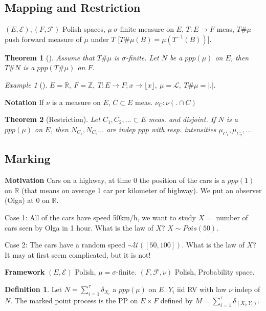\documentclass[12pt]{book}
\newtheorem{theorem}{Theorem}[section]
\theoremstyle{definition}
\newtheorem{defn}{Definition}[section]
\theoremstyle{remark}
\newtheorem{ex}{Example}[section]
\begin{document}
\subsection{Mapping and Restriction}
$(E, \mathcal{E}), (F, \mathcal{F})$ Polish spaces, $\mu\ \sigma$-finite measure on $E$,  $T:E \to F$ meas, $T\#\mu $ push forward measure of $\mu $ under $T$ [$T\#\mu(B)=\mu(T^{-1}(B))$].

\begin{theorem}[]
	Assume that $T\#\mu$ is $\sigma$-finite. Let $N$ be a $ppp(\mu)$ on $E$, then $T\#N$ is a $ppp(T\#\mu)$ on $F$.
\end{theorem}

\begin{ex}[]
	$E=\mathbb{R},\ F=\mathbb{Z},\ T:E \to F; x \to \lfloor x \rfloor,\ \mu= \mathcal{L},\ T\#\mu=|.|$.
\end{ex}
\noindent
\textbf{Notation} If $\nu $ is a measure on $E$, $C \subset E$ meas.  $\nu _C: \nu(. \cap C)$

\begin{theorem}[Restriction]
	Let $C_1, C_2,... \subset E$ meas. and disjoint. If $N$ is a  $ppp(\mu)$ on  $E$, then $N_{C_1}, N_{C_2}...$ are indep $ppp$ with resp. intensities $\mu_{C_1}, \mu_{C_2},...$	
\end{theorem}

\subsection{Marking}
\noindent
\textbf{Motivation} Cars on a highway, at time 0 the position of the cars is a $ppp(1)$ on $\mathbb{R}$ (that means on average 1 car per kilometer of highway). We put an observer (Olga) at 0 on $\mathbb{R}$.

Case 1: All of the cars have speed 50km/h, we want to study $X=$ number of cars seen by Olga in 1 hour. What is the law of $X$? $X \sim Pois(50)$.

Case 2: The cars have a random speed $ \sim \mathcal{U}([50,100]) $. What is the law of $X$? It may at first seem complicated, but it is not!

\noindent
\textbf{Framework} $(E, \mathcal{E})$ Polish, $\mu=\sigma$-finite. $(F, \mathcal{F}, \nu )$ Polish, Probability space.
\begin{defn}
	Let $N=\sum_{i=1}^{\tau} \delta_{X_i}$ a $ppp(\mu)$ on $E$. $Y_i$ iid RV with law $\nu $ indep of $N$. The marked point process is the PP on $E \times F$ defined by $M=\sum_{i=1}^{\tau} \delta_{(X_i, Y_i)}$.
\end{defn}
\end{document}
